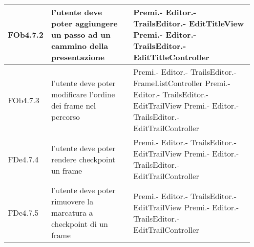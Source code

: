 \begin{longtable}{|l|p{5cm}|p{7cm}|}
\hline
FOb4.7.2 & l'utente deve poter aggiungere un passo ad un cammino della presentazione & Premi.- \linebreak Editor.- \linebreak TrailsEditor.- \linebreak EditTitleView \linebreak Premi.- \linebreak Editor.- \linebreak TrailsEditor.- \linebreak EditTitleController \linebreak \\
\hline
FOb4.7.3 & l'utente deve poter modificare l'ordine dei frame nel percorso & Premi.- \linebreak Editor.- \linebreak TrailsEditor.- \linebreak FrameListController \linebreak Premi.- \linebreak Editor.- \linebreak TrailsEditor.- \linebreak EditTrailView \linebreak Premi.- \linebreak Editor.- \linebreak TrailsEditor.- \linebreak EditTrailController \linebreak \\
\hline
FDe4.7.4 & l'utente deve poter rendere checkpoint un frame & Premi.- \linebreak Editor.- \linebreak TrailsEditor.- \linebreak EditTrailView \linebreak Premi.- \linebreak Editor.- \linebreak TrailsEditor.- \linebreak EditTrailController \linebreak \\
\hline
FDe4.7.5 & l'utente deve poter rimuovere la marcatura a checkpoint di un frame & Premi.- \linebreak Editor.- \linebreak TrailsEditor.- \linebreak EditTrailView \linebreak Premi.- \linebreak Editor.- \linebreak TrailsEditor.- \linebreak EditTrailController \linebreak \\

\end{longtable}
